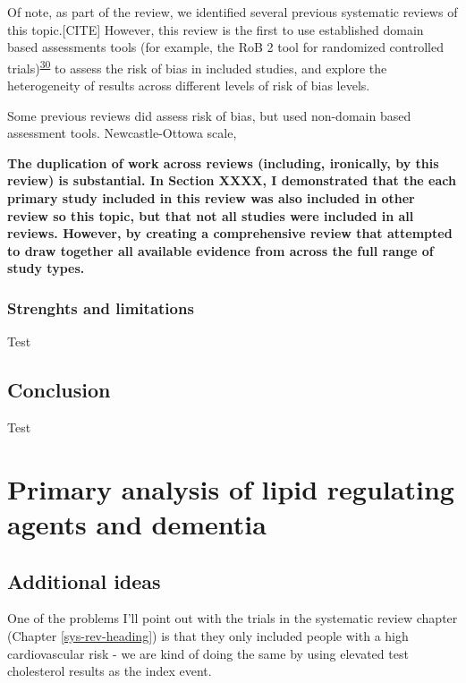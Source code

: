 \documentclass[a4paper, twoside]{templates/ociamthesis}
\begin{document}
Of note, as part of the review, we identified several previous systematic reviews of this topic.{[}CITE{]} However, this review is the first to use established domain based assessments tools (for example, the RoB 2 tool for randomized controlled trials)\textsuperscript{\protect\hyperlink{ref-sterne2019}{30}} to assess the risk of bias in included studies, and explore the heterogeneity of results across different levels of risk of bias levels.

Some previous reviews did assess risk of bias, but used non-domain based assessment tools. Newcastle-Ottowa scale,

\textbf{The duplication of work across reviews (including, ironically, by this review) is substantial. In Section XXXX, I demonstrated that the each primary study included in this review was also included in other review so this topic, but that not all studies were included in all reviews. However, by creating a comprehensive review that attempted to draw together all available evidence from across the full range of study types.}

\hypertarget{strenghts-and-limitations}{%
\subsection{Strenghts and limitations}\label{strenghts-and-limitations}}

Test

\hypertarget{conclusion}{%
\section{Conclusion}\label{conclusion}}

Test



\hypertarget{cprd-analysis-heading}{%
\chapter{Primary analysis of lipid regulating agents and dementia}\label{cprd-analysis-heading}}

\minitoc 

\hypertarget{additional-ideas-2}{%
\section{Additional ideas}\label{additional-ideas-2}}

One of the problems I'll point out with the trials in the systematic review chapter (Chapter \ref{sys-rev-heading}) is that they only included people with a high cardiovascular risk - we are kind of doing the same by using elevated test cholesterol results as the index event.
\end{document}

